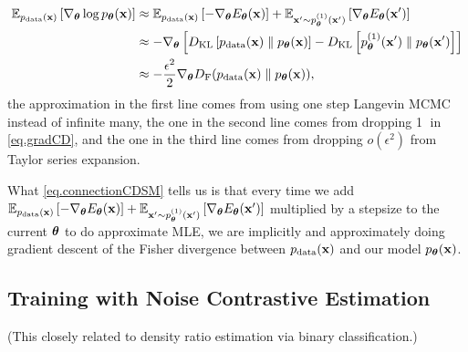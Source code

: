 \documentclass{article}
\begin{document}
\begin{equation}\label{eq.connectionCDSM}
    \begin{aligned}
        \mathbb{E}_{p_{\rm{data}}({\mathbf{x}})}\left[ \nabla_{\bm{\theta}} \log p_{\bm{\theta}}({\mathbf{x}}) \right]
        &\approx \mathbb{E}_{p_{\rm{data}}({\mathbf{x}})}\left[ -\nabla_{\bm{\theta}} E_{\bm{\theta}}({\mathbf{x}}) \right] + \mathbb{E}_{{{\mathbf{x}}'} \sim p^{(1)}_{{\bm{\theta}}}({\mathbf{x}}')}\left[ \nabla_{\bm{\theta}} E_{\bm{\theta}}({\mathbf{x}}') \right] \\
        &\approx -\nabla_{\bm{\theta}}\left[ D_{\mathrm{KL}}\left[ p_{\rm{data}}({\mathbf{x}})\parallel p_{\bm{\theta}}({\mathbf{x}}) \right] - D_{\mathrm{KL}}\left[ p^{(1)}_{{\bm{\theta}}}({\mathbf{x}}') \parallel p_{\bm{\theta}}({\mathbf{x}}')\right] \right] \\
        &\approx -\frac{\epsilon^2}{2}\nabla_{\bm{\theta}}  D_{\mathrm{F}}(p_{\rm{data}}({\mathbf{x}}) \parallel p_{\bm{\theta}}({\mathbf{x}})),
    \end{aligned}
\end{equation}
the approximation in the first line comes from using one step Langevin MCMC instead of infinite many, the one in the second line comes from dropping \textcircled{1} in \eqref{eq.gradCD}, and the one in the third line comes from dropping $o(\epsilon^2)$ from Taylor series expansion. 

What \eqref{eq.connectionCDSM} tells us is that every time we add $\mathbb{E}_{p_{\rm{data}}({\mathbf{x}})}\left[ -\nabla_{\bm{\theta}} E_{\bm{\theta}}({\mathbf{x}}) \right] + \mathbb{E}_{{{\mathbf{x}}'} \sim p^{(1)}_{{\bm{\theta}}}({\mathbf{x}}')}\left[ \nabla_{\bm{\theta}} E_{\bm{\theta}}({\mathbf{x}}') \right]$ multiplied by a stepsize to the current ${\bm{\theta}}$ to do approximate MLE, we are implicitly and approximately doing gradient descent of the Fisher divergence between $p_{\rm{data}}({\mathbf{x}})$ and our model $p_{\bm{\theta}}({\mathbf{x}})$.
\subsection{Training with Noise Contrastive Estimation}
(This closely related to density ratio estimation via binary classification.)
\end{document}
